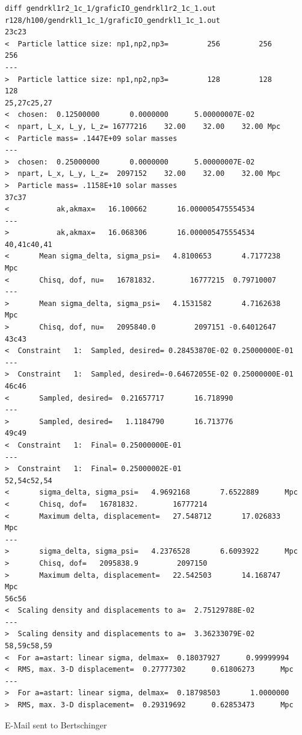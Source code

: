 \documentclass[a4paper,11pt,fleqn,oneside]{book}
\begin{document}
\begin{verbatim}
diff gendrkl1r2_1c_1/graficIO_gendrkl1r2_1c_1.out r128/h100/gendrkl1_1c_1/graficIO_gendrkl1_1c_1.out 
23c23
<  Particle lattice size: np1,np2,np3=         256         256         256
---
>  Particle lattice size: np1,np2,np3=         128         128         128
25,27c25,27
<  chosen:  0.12500000       0.0000000      5.00000007E-02
<  npart, L_x, L_y, L_z= 16777216    32.00    32.00    32.00 Mpc
<  Particle mass= .1447E+09 solar masses
---
>  chosen:  0.25000000       0.0000000      5.00000007E-02
>  npart, L_x, L_y, L_z=  2097152    32.00    32.00    32.00 Mpc
>  Particle mass= .1158E+10 solar masses
37c37
<           ak,akmax=   16.100662       16.000005475554534     
---
>           ak,akmax=   16.068306       16.000005475554534     
40,41c40,41
<       Mean sigma_delta, sigma_psi=   4.8100653       4.7177238      Mpc
<       Chisq, dof, nu=   16781832.        16777215  0.79710007    
---
>       Mean sigma_delta, sigma_psi=   4.1531582       4.7162638      Mpc
>       Chisq, dof, nu=   2095840.0         2097151 -0.64012647    
43c43
<  Constraint   1:  Sampled, desired= 0.28453870E-02 0.25000000E-01
---
>  Constraint   1:  Sampled, desired=-0.64672055E-02 0.25000000E-01
46c46
<       Sampled, desired=  0.21657717       16.718990    
---
>       Sampled, desired=   1.1184790       16.713776    
49c49
<  Constraint   1:  Final= 0.25000000E-01
---
>  Constraint   1:  Final= 0.25000002E-01
52,54c52,54
<       sigma_delta, sigma_psi=   4.9692168       7.6522889      Mpc
<       Chisq, dof=   16781832.        16777214
<       Maximum delta, displacement=   27.548712       17.026833      Mpc
---
>       sigma_delta, sigma_psi=   4.2376528       6.6093922      Mpc
>       Chisq, dof=   2095838.9         2097150
>       Maximum delta, displacement=   22.542503       14.168747      Mpc
56c56
<  Scaling density and displacements to a=  2.75129788E-02
---
>  Scaling density and displacements to a=  3.36233079E-02
58,59c58,59
<  For a=astart: linear sigma, delmax=  0.18037927      0.99999994    
<  RMS, max. 3-D displacement=  0.27777302      0.61806273      Mpc
---
>  For a=astart: linear sigma, delmax=  0.18798503       1.0000000    
>  RMS, max. 3-D displacement=  0.29319692      0.62853473      Mpc

\end{verbatim}

E-Mail sent to Bertschinger \\
\end{document}
